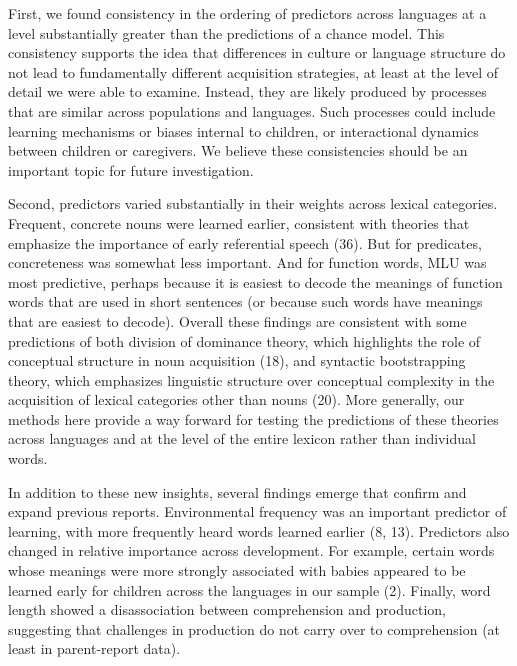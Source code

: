 \documentclass[english,man]{apa6}
\theoremstyle{definition}
\theoremstyle{definition}
\theoremstyle{definition}
\theoremstyle{remark}
\begin{document}
First, we found consistency in the ordering of predictors across
languages at a level substantially greater than the predictions of a
chance model. This consistency supports the idea that differences in
culture or language structure do not lead to fundamentally different
acquisition strategies, at least at the level of detail we were able to
examine. Instead, they are likely produced by processes that are similar
across populations and languages. Such processes could include learning
mechanisms or biases internal to children, or interactional dynamics
between children or caregivers. We believe these consistencies should be
an important topic for future investigation.

Second, predictors varied substantially in their weights across lexical
categories. Frequent, concrete nouns were learned earlier, consistent
with theories that emphasize the importance of early referential speech
(36). But for predicates, concreteness was somewhat less important. And
for function words, MLU was most predictive, perhaps because it is
easiest to decode the meanings of function words that are used in short
sentences (or because such words have meanings that are easiest to
decode). Overall these findings are consistent with some predictions of
both division of dominance theory, which highlights the role of
conceptual structure in noun acquisition (18), and syntactic
bootstrapping theory, which emphasizes linguistic structure over
conceptual complexity in the acquisition of lexical categories other
than nouns (20). More generally, our methods here provide a way forward
for testing the predictions of these theories across languages and at
the level of the entire lexicon rather than individual words.

In addition to these new insights, several findings emerge that confirm
and expand previous reports. Environmental frequency was an important
predictor of learning, with more frequently heard words learned earlier
(8, 13). Predictors also changed in relative importance across
development. For example, certain words whose meanings were more
strongly associated with babies appeared to be learned early for
children across the languages in our sample (2). Finally, word length
showed a disassociation between comprehension and production, suggesting
that challenges in production do not carry over to comprehension (at
least in parent-report data).
\end{document}
